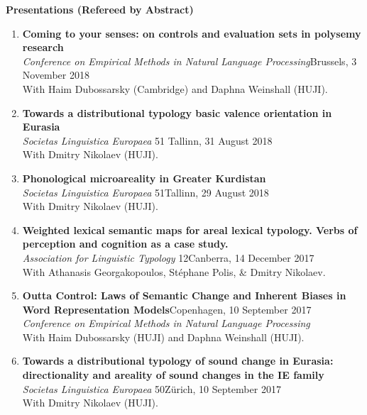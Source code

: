 \documentclass[letterpaper,11pt]{article}
\newcommand{\resheading}[1]{
\vspace*{6pt}
{\large \colorbox{mygrey}{\begin{minipage}{\textwidth}{\textbf{#1 \vphantom{p\^{E}}}}\end{minipage}}}
}
\begin{document}
\newpage
\resheading{Presentations (Refereed by Abstract)} 
\begin{enumerate}
\vspace{-0.025 in}
\vspace*{-4pt}
\item \textbf{Coming to your senses: on controls and evaluation sets in polysemy research}\\\textit{Conference on Empirical Methods in Natural Language Processing}\hfill{Brussels, 3 November 2018}\\With Haim Dubossarsky (Cambridge) and Daphna Weinshall (HUJI).

\item \textbf{Towards a distributional typology basic valence orientation in Eurasia}\\\textit{{Societas Linguistica Europaea}} 51 \hfill{Tallinn, 31 August 2018}\\With Dmitry Nikolaev (HUJI).

\item \textbf{Phonological microareality in Greater Kurdistan}\\{\textit{Societas Linguistica Europaea}} 51\hfill{Tallinn, 29 August 2018}\\With Dmitry Nikolaev (HUJI).

\item \textbf{Weighted lexical semantic
maps for areal lexical typology. Verbs of perception and cognition as a case study.}\\\textit{Association for Linguistic Typology} 12\hfill{Canberra, 14 December 2017}\\
With Athanasis Georgakopoulos, St\'ephane Polis, \& Dmitry Nikolaev.

\item \textbf{Outta Control: Laws of Semantic Change and Inherent Biases in Word Representation Models}\hfill{Copenhagen, 10 September 2017}\\{\textit{Conference on Empirical Methods in Natural Language Processing}}\\With Haim Dubossarsky (HUJI) and Daphna Weinshall (HUJI).

\item \textbf{Towards a distributional typology of sound change in Eurasia: directionality and areality of sound changes in the IE family}\\{\textit{Societas Linguistica Europaea }} 50\hfill{Z\"urich, 10 September 2017}\\With Dmitry Nikolaev (HUJI).


\end{enumerate}
\end{document}
